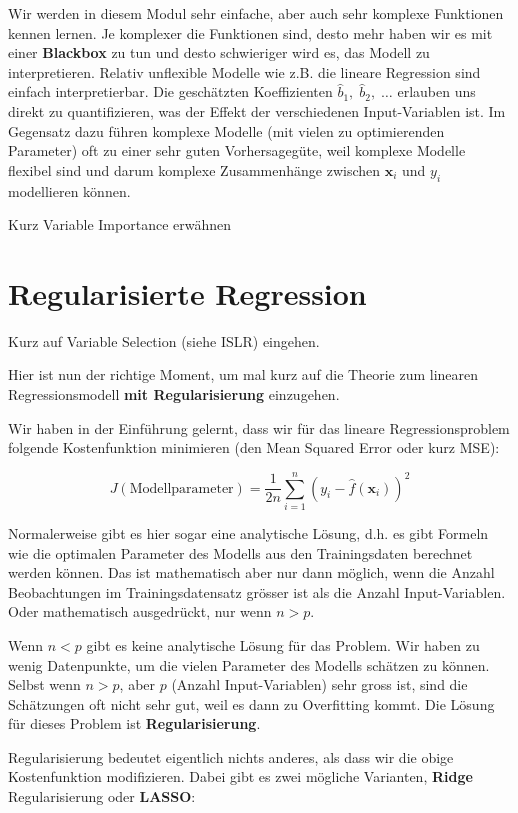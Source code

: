 \documentclass[
]{book}
\begin{document}
Wir werden in diesem Modul sehr einfache, aber auch sehr komplexe Funktionen kennen lernen. Je komplexer die Funktionen sind, desto mehr haben wir es mit einer \textbf{Blackbox} zu tun und desto schwieriger wird es, das Modell zu interpretieren. Relativ unflexible Modelle wie z.B. die lineare Regression sind einfach interpretierbar. Die geschätzten Koeffizienten \(\hat{b}_1,\; \hat{b}_2,\; \ldots\) erlauben uns direkt zu quantifizieren, was der Effekt der verschiedenen Input-Variablen ist. Im Gegensatz dazu führen komplexe Modelle (mit vielen zu optimierenden Parameter) oft zu einer sehr guten Vorhersagegüte, weil komplexe Modelle flexibel sind und darum komplexe Zusammenhänge zwischen \(\mathbf{x}_i\) und \(y_i\) modellieren können.

Kurz Variable Importance erwähnen

\hypertarget{regularisierte-regression}{%
\section{Regularisierte Regression}\label{regularisierte-regression}}

Kurz auf Variable Selection (siehe ISLR) eingehen.

Hier ist nun der richtige Moment, um mal kurz auf die Theorie zum linearen Regressionsmodell \textbf{mit Regularisierung} einzugehen.

Wir haben in der Einführung gelernt, dass wir für das lineare Regressionsproblem folgende Kostenfunktion minimieren (den Mean Squared Error oder kurz MSE):

\[
J(\text{Modellparameter}) = \frac{1}{2n} \sum_{i=1}^{n} \left(y_i - \hat{f}(\mathbf{x}_i) \right)^2
\]

Normalerweise gibt es hier sogar eine analytische Lösung, d.h. es gibt Formeln wie die optimalen Parameter des Modells aus den Trainingsdaten berechnet werden können. Das ist mathematisch aber nur dann möglich, wenn die Anzahl Beobachtungen im Trainingsdatensatz grösser ist als die Anzahl Input-Variablen. Oder mathematisch ausgedrückt, nur wenn \(n>p\).

Wenn \(n<p\) gibt es keine analytische Lösung für das Problem. Wir haben zu wenig Datenpunkte, um die vielen Parameter des Modells schätzen zu können. Selbst wenn \(n>p\), aber \(p\) (Anzahl Input-Variablen) sehr gross ist, sind die Schätzungen oft nicht sehr gut, weil es dann zu Overfitting kommt. Die Lösung für dieses Problem ist \textbf{Regularisierung}.

Regularisierung bedeutet eigentlich nichts anderes, als dass wir die obige Kostenfunktion modifizieren. Dabei gibt es zwei mögliche Varianten, \textbf{Ridge} Regularisierung oder \textbf{LASSO}:
\end{document}
